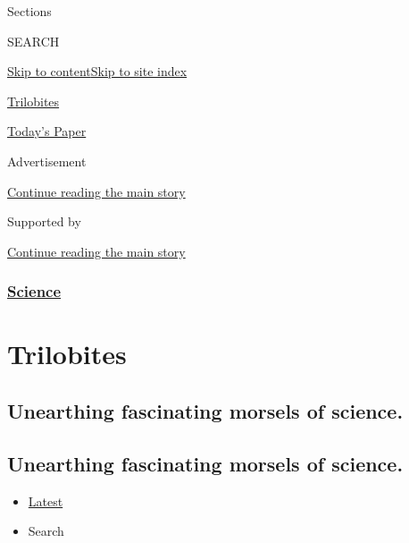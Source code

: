 Sections

SEARCH

\protect\hyperlink{site-content}{Skip to
content}\protect\hyperlink{site-index}{Skip to site index}

\href{https://www.nytimes3xbfgragh.onion/column/trilobites}{Trilobites}

\href{https://myaccount.nytimes3xbfgragh.onion/auth/login?response_type=cookie\&client_id=vi}{}

\href{https://www.nytimes3xbfgragh.onion/section/todayspaper}{Today's
Paper}

Advertisement

\protect\hyperlink{after-top}{Continue reading the main story}

Supported by

\protect\hyperlink{after-sponsor}{Continue reading the main story}

\hypertarget{science}{%
\subsubsection{\texorpdfstring{\href{/section/science}{Science}}{Science}}\label{science}}

\hypertarget{trilobites}{%
\section{Trilobites}\label{trilobites}}

\hypertarget{unearthing-fascinating-morsels-of-science}{%
\subsection{Unearthing fascinating morsels of
science.}\label{unearthing-fascinating-morsels-of-science}}

\hypertarget{unearthing-fascinating-morsels-of-science-1}{%
\subsection{Unearthing fascinating morsels of
science.}\label{unearthing-fascinating-morsels-of-science-1}}

\begin{itemize}
\tightlist
\item
  \protect\hyperlink{stream-panel}{Latest}
\item
  Search
\end{itemize}

